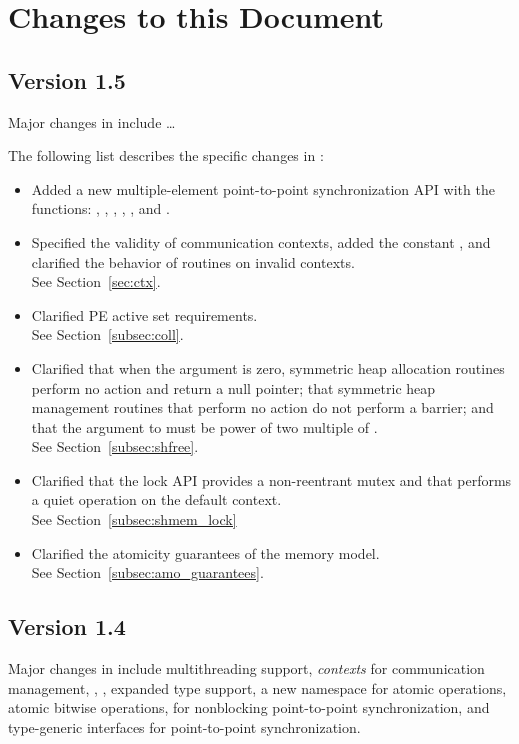 \chapter{Changes to this Document}\label{sec:changelog}

\section{Version 1.5}
Major changes in \openshmem[1.5] include \dots

The following list describes the specific changes in \openshmem[1.5]:
\begin{itemize}
%
\item Added a new multiple-element point-to-point synchronization API with
  the functions: , ,
  , ,
  , and .
%
\item Specified the validity of communication contexts, added the constant
  , and clarified the behavior of
   routines on invalid contexts.
  \\ See Section~\ref{sec:ctx}.
%
\item Clarified \ac{PE} active set requirements.
    \\See Section~\ref{subsec:coll}.
%
\item Clarified that when the  argument is zero, symmetric heap
    allocation routines perform no action and return a null pointer; that
    symmetric heap management routines that perform no action do not perform a
    barrier; and that the  argument to  must
    be power of two multiple of .
    \\See Section~\ref{subsec:shfree}.
%
\item Clarified that the \openshmem lock API provides a non-reentrant mutex and
    that  performs a quiet operation on the default
    context.
    \\See Section~\ref{subsec:shmem_lock}
%
\item Clarified the atomicity guarantees of the \openshmem memory model.
    \\See Section~\ref{subsec:amo_guarantees}.
%
\end{itemize}

\section{Version 1.4}
Major changes in \openshmem[1.4] include
multithreading support,
\emph{contexts} for communication management,
,
,
expanded type support,
a new namespace for atomic operations,
atomic bitwise operations,
 for nonblocking point-to-point synchronization,
and \Cstd[11] type-generic interfaces for point-to-point synchronization.

